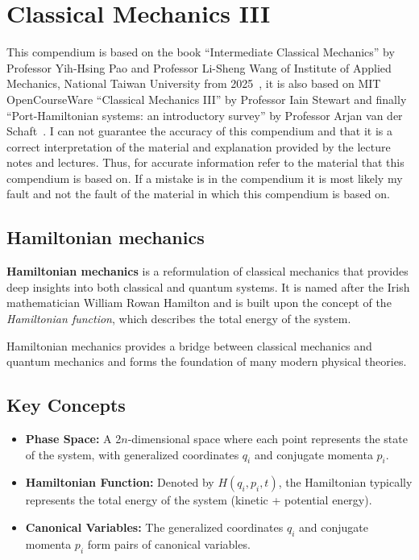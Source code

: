 \chapter{Classical Mechanics III}
This compendium is based on the book ``Intermediate Classical Mechanics'' by Professor Yih-Hsing Pao and Professor Li-Sheng Wang of Institute of Applied Mechanics, National Taiwan University from 2025~\cite{Pao2025Intermediate}, it is also based on MIT OpenCourseWare ``Classical Mechanics III'' by Professor Iain Stewart and finally ``Port-Hamiltonian systems: an introductory survey'' by Professor Arjan van der Schaft~\cite{Port-HamiltonianAjal2006}.
I can not guarantee the accuracy of this compendium and that it is a correct interpretation of the material and explanation provided by the lecture notes and lectures. Thus, for accurate information refer to the material that this compendium is based on. If a mistake is in the compendium it is most likely my fault and not the fault of the material in which this compendium is based on.

\section{Hamiltonian mechanics}
\textbf{Hamiltonian mechanics} is a reformulation of classical mechanics that provides deep insights into both classical and quantum systems. It is named after the Irish mathematician William Rowan Hamilton and is built upon the concept of the \textit{Hamiltonian function}, which describes the total energy of the system.

Hamiltonian mechanics provides a bridge between classical mechanics and quantum mechanics and forms the foundation of many modern physical theories.

\section{Key Concepts}
\begin{itemize}
    \item \textbf{Phase Space:} A 2$n$-dimensional space where each point represents the state of the system, with generalized coordinates $q_i$ and conjugate momenta $p_i$.
    \item \textbf{Hamiltonian Function:} Denoted by $H(q_i, p_i, t)$, the Hamiltonian typically represents the total energy of the system (kinetic + potential energy).
    \item \textbf{Canonical Variables:} The generalized coordinates $q_i$ and conjugate momenta $p_i$ form pairs of canonical variables.
\end{itemize}

